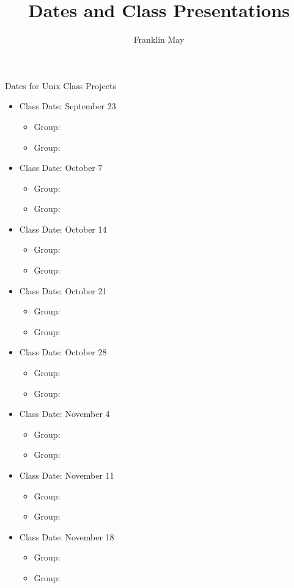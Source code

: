 \documentclass[12pt]{article}
\begin{document}
\author{Franklin May}
\title{Dates and Class Presentations}
\maketitle

Dates for Unix Class Projects
\begin{itemize}
\item Class Date: September 23
\begin{itemize}
\item Group:
\item Group:
\end{itemize}
\item Class Date: October 7
\begin{itemize}
\item Group:
\item Group:
\end{itemize}
\item Class Date: October 14
\begin{itemize}
\item Group:
\item Group:
\end{itemize}
\item Class Date: October 21
\begin{itemize}
\item Group:
\item Group:
\end{itemize}
\item Class Date: October 28
\begin{itemize}
\item Group:
\item Group:
\end{itemize}
\item Class Date: November 4
\begin{itemize}
\item Group:
\item Group:
\end{itemize}
\item Class Date: November 11
\begin{itemize}
\item Group:
\item Group:
\end{itemize}
\item Class Date: November 18
\begin{itemize}
\item Group:
\item Group:
\end{itemize}
\end{itemize}
\end{document}
